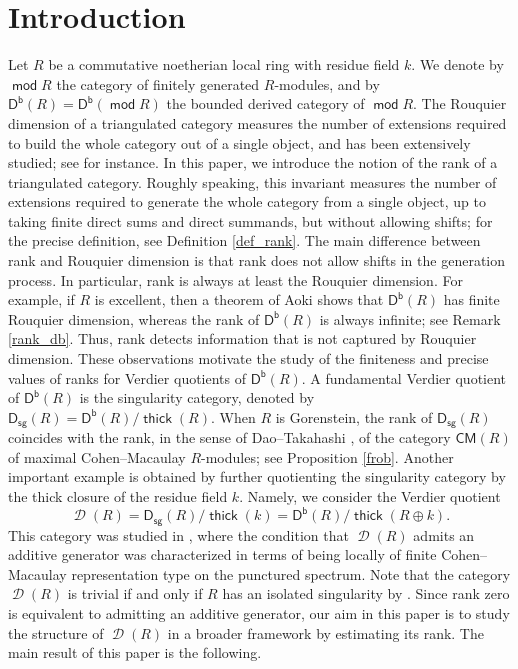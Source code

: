 \documentclass[10pt]{amsart}
\theoremstyle{definition}
\theoremstyle{remark}
\numberwithin{equation}{thm}
\def\CM{\mathsf{CM}}
\def\d{\operatorname{\mathscr{D}}}
\def\db{\operatorname{\mathsf{D^b}}}
\def\ds{\operatorname{\mathsf{D_{sg}}}}
\def\mod{\operatorname{\mathsf{mod}}}
\def\thick{\operatorname{\mathsf{thick}}}
\begin{document}
\section{Introduction}
Let $R$ be a commutative noetherian local ring with residue field $k$.
We denote by $\mod R$ the category of finitely generated $R$-modules, and by $\db(R)=\db(\mod R)$ the bounded derived category of $\mod R$.
The Rouquier dimension of a triangulated category measures the number of extensions required to build the whole category out of a single object, and has been extensively studied; see \cite{AT2015,BV,DT2015a,DT2015b,Rou} for instance.
In this paper, we introduce the notion of the rank of a triangulated category.
Roughly speaking, this invariant measures the number of extensions required to generate the whole category from a single object, up to taking finite direct sums and direct summands, but without allowing shifts; for the precise definition, see Definition \ref{def_rank}.
The main difference between rank and Rouquier dimension is that rank does not allow shifts in the generation process.
In particular, rank is always at least the Rouquier dimension.
For example, if $R$ is excellent, then a theorem of Aoki \cite{Aoki} shows that $\db(R)$ has finite Rouquier dimension, whereas the rank of $\db(R)$ is always infinite; see Remark \ref{rank_db}.
Thus, rank detects information that is not captured by Rouquier dimension.
These observations motivate the study of the finiteness and precise values of ranks for Verdier quotients of $\db(R)$.
A fundamental Verdier quotient of $\db(R)$ is the singularity category, denoted by $\ds(R)=\db(R)/\thick(R)$.
When $R$ is Gorenstein, the rank of $\ds(R)$ coincides with the rank, in the sense of Dao--Takahashi \cite{DT2014}, of the category $\CM(R)$ of maximal Cohen--Macaulay $R$-modules; see Proposition \ref{frob}.
Another important example is obtained by further quotienting the singularity category by the thick closure of the residue field $k$. 
Namely, we consider the Verdier quotient
\[
\d(R)=\ds(R)/\thick(k)=\db(R)/\thick(R\oplus k).
\]
This category was studied in \cite{MT}, where the condition that $\d(R)$ admits an additive generator was characterized in terms of being locally of finite Cohen--Macaulay representation type on the punctured spectrum.
Note that the category $\d(R)$ is trivial if and only if $R$ has an isolated singularity by \cite{T2014}.
Since rank zero is equivalent to admitting an additive generator, our aim in this paper is to study the structure of $\d(R)$ in a broader framework by estimating its rank.
The main result of this paper is the following.
\end{document}
